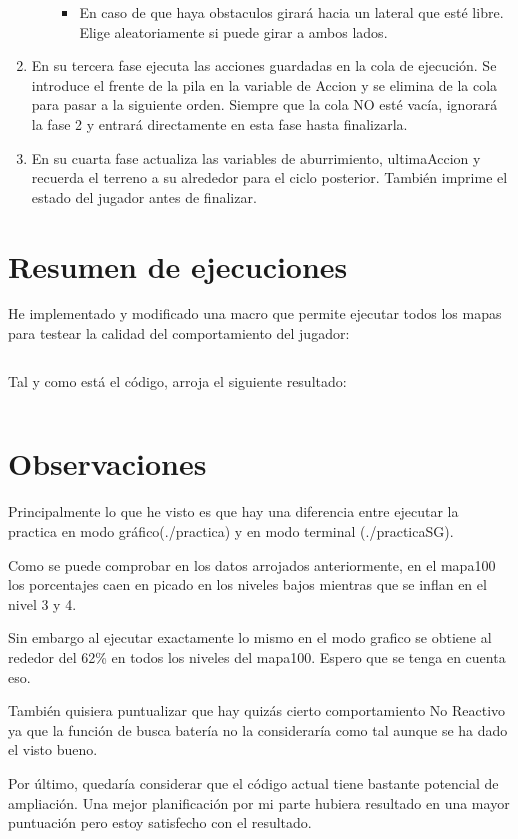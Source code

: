 \documentclass[12pt, spanish]{article}
\begin{document}
\begin{enumerate}
\begin{itemize}
\begin{itemize}
      \item En caso de que haya obstaculos girará hacia un lateral que esté libre. Elige aleatoriamente si puede girar a ambos lados.
      \end{itemize}

  \end{itemize}

  \item En su tercera fase ejecuta las acciones guardadas en la cola de ejecución. Se introduce el frente de la pila en la variable de Accion y se elimina de la cola para pasar a la siguiente orden. Siempre que la cola NO esté vacía, ignorará la fase 2 y entrará directamente en esta fase hasta finalizarla.

  \item En su cuarta fase actualiza las variables de aburrimiento, ultimaAccion y recuerda el terreno a su alrededor para el ciclo posterior. También imprime el estado del jugador antes de finalizar.

\end{enumerate}


\section{Resumen de ejecuciones}
He implementado y modificado una macro que permite ejecutar todos los mapas para testear la calidad del comportamiento del jugador:

\inputminted{sh}{testsIA.sh}

Tal y como está el código, arroja el siguiente resultado:

\inputminted{text}{resultados-7.dat}


\section{Observaciones}
Principalmente lo que he visto es que hay una diferencia entre ejecutar la practica en modo gráfico(./practica) y en modo terminal (./practicaSG).

Como se puede comprobar en los datos arrojados anteriormente, en el mapa100 los porcentajes caen en picado en los niveles bajos mientras que se inflan en el nivel 3 y 4.

Sin embargo al ejecutar exactamente lo mismo en el modo grafico se obtiene al rededor del 62\% en todos los niveles del mapa100. Espero que se tenga en cuenta eso.

También quisiera puntualizar que hay quizás cierto comportamiento No Reactivo ya que la función de busca batería no la consideraría como tal aunque se ha dado el visto bueno.

Por último, quedaría considerar que el código actual tiene bastante potencial de ampliación. Una mejor planificación por mi parte hubiera resultado en una mayor puntuación pero estoy satisfecho con el resultado.


\vspace{5cm}
 
 
\end{document}
